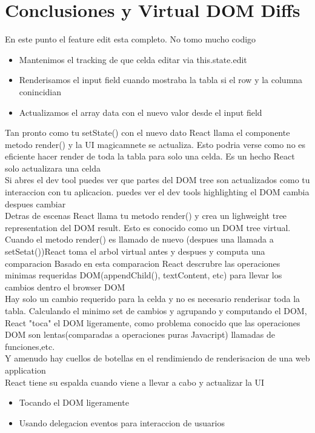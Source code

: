 \section{Conclusiones y Virtual DOM Diffs}
En este punto el feature edit esta completo. No tomo mucho codigo
\begin{itemize}
  \item Mantenimos el tracking de que celda editar via this.state.edit
  \item Renderisamos el input field cuando mostraba la tabla si el row y la columna conincidian 
  \item Actualizamos el array data con el nuevo valor desde el input field
\end{itemize}
Tan pronto como tu setState() con el nuevo dato React llama el componente metodo render() y la UI magicamnete se actualiza. Esto podria verse como no es eficiente hacer render de toda la tabla para solo una celda. Es un hecho React solo actualizara una celda \\
Si abres el dev tool puedes ver que partes del DOM tree son actualizados como tu interaccion con tu aplicacion. puedes ver el dev tools highlighting el DOM cambia despues cambiar\\
Detras de escenas React llama tu metodo render() y crea un lighweight tree representation del DOM result. Esto es conocido como un DOM tree virtual. Cuando el metodo render() es llamado de nuevo (despues una llamada a setSetat())React toma el arbol virtual antes y despues y computa una comparacion Basado en esta comparacion React descrubre las operaciones minimas requeridas DOM(appendChild(), textContent, etc) para llevar los cambios dentro el browser DOM\\
Hay solo un cambio requerido para la celda y no es necesario renderisar toda la tabla. Calculando el minimo set de cambios y agrupando y computando el DOM, React "toca" el DOM ligeramente, como problema conocido que las operaciones DOM son lentas(comparadas a operaciones puras Javacript) llamadas de funciones,etc.\\
Y amenudo hay cuellos de botellas en el rendimiendo de renderisacion de una web application\\
React tiene su espalda cuando viene a llevar a cabo y actualizar la UI
\begin{itemize}
  \item Tocando el DOM ligeramente
  \item Usando delegacion eventos para interaccion de usuarios
\end{itemize}

